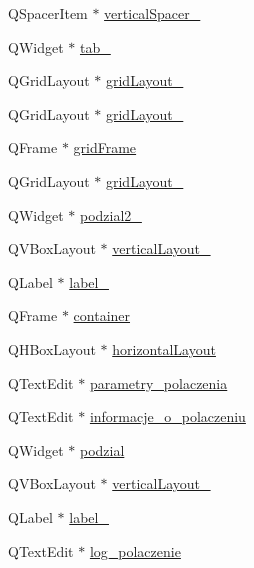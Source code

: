 \begin{DoxyCompactItemize}
\item 
Q\+Spacer\+Item $\ast$ \hyperlink{class_ui___main_window_a2e4c63737c14e5af736837df590fe004}{vertical\+Spacer\+\_}
\item 
Q\+Widget $\ast$ \hyperlink{class_ui___main_window_a83495b23cbc6810f81978dc0d584b810}{tab\+\_}
\item 
Q\+Grid\+Layout $\ast$ \hyperlink{class_ui___main_window_a4c2d544352d423a361b8ab2e1d5636ec}{grid\+Layout\+\_}
\item 
Q\+Grid\+Layout $\ast$ \hyperlink{class_ui___main_window_ad113cf7b76aaf178473555bdf64ff035}{grid\+Layout\+\_}
\item 
Q\+Frame $\ast$ \hyperlink{class_ui___main_window_a342d9ebc7815d3e3cc287d2847fc9e82}{grid\+Frame}
\item 
Q\+Grid\+Layout $\ast$ \hyperlink{class_ui___main_window_a6b2a0c5f7e8ff2a87134908dd770d2d2}{grid\+Layout\+\_}
\item 
Q\+Widget $\ast$ \hyperlink{class_ui___main_window_a4eb6355fb4170b814c9a0891dc1b88c7}{podzial2\+\_}
\item 
Q\+V\+Box\+Layout $\ast$ \hyperlink{class_ui___main_window_a6f40fc110b15410c00837a446d57bdbe}{vertical\+Layout\+\_}
\item 
Q\+Label $\ast$ \hyperlink{class_ui___main_window_a0e90c7e9ad77386881e0b264ddb9dd22}{label\+\_}
\item 
Q\+Frame $\ast$ \hyperlink{class_ui___main_window_aae873162a1f0857324542157aa618a20}{container}
\item 
Q\+H\+Box\+Layout $\ast$ \hyperlink{class_ui___main_window_acd6fdc9ebacc4b25b834162380d75ce8}{horizontal\+Layout}
\item 
Q\+Text\+Edit $\ast$ \hyperlink{class_ui___main_window_a88cb7ad9dfb013b11e125d5f029301e8}{parametry\+\_\+polaczenia}
\item 
Q\+Text\+Edit $\ast$ \hyperlink{class_ui___main_window_a77fbc26afe496853f804a445b68acd9b}{informacje\+\_\+o\+\_\+polaczeniu}
\item 
Q\+Widget $\ast$ \hyperlink{class_ui___main_window_acba352c7c0c7e24037c604c45fb72579}{podzial}
\item 
Q\+V\+Box\+Layout $\ast$ \hyperlink{class_ui___main_window_a38b8a4b887f3b58e2a49e7905ae6f1f0}{vertical\+Layout\+\_}
\item 
Q\+Label $\ast$ \hyperlink{class_ui___main_window_af183bfbfb9f38bbdd60caf92b15e23dc}{label\+\_}
\item 
Q\+Text\+Edit $\ast$ \hyperlink{class_ui___main_window_ada841d133b588c2104e42f28f1bb37c4}{log\+\_\+polaczenie}

\end{DoxyCompactItemize}
